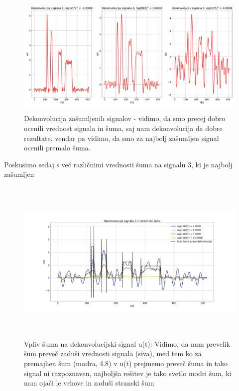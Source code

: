 \documentclass[11pt, a4paper]{article}
\begin{document}
\begin{figure}[H]
\includegraphics[width=16cm, height=6cm]{druga_drugi3dekonvolucija.pdf}
\caption{Dekonvolucija zašumljenih signalov - vidimo, da smo precej dobro ocenili vrednost signala in šuma, saj nam dekonvolucija da dobre rezultate, vendar pa vidimo, da smo za najbolj zašumljen signal ocenili premalo šuma.}  
\end{figure}
Poskusimo sedaj s več različnimi vrednosti šuma na signalu 3, ki je najbolj zašumljen
\begin{figure}[H]
\includegraphics[width=16cm, height=8cm]{druga_prava_dekonvolucija.pdf}
\caption{Vpliv šuma na dekonvolucijski signal u(t): Vidimo, da nam prevelik šum preveč zaduši vrednosti signala (siva), med tem ko za premajhen šum (modra, 4.8) v u(t) prejmemo preveč šuma in tako signal ni razpoznaven, najboljša rešitev je tako svetlo modri šum, ki nam ojači le vrhove in zaduši stranski šum }  
\end{figure}
\end{document}
